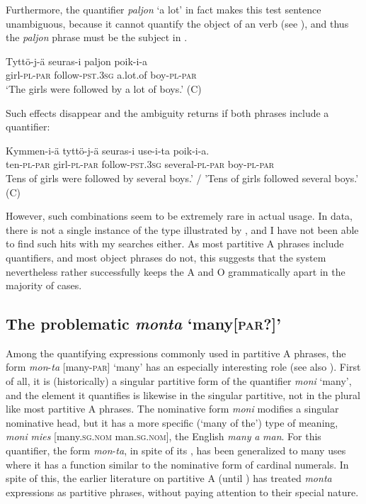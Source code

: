 \documentclass[output=paper]{LSP/langsci}
\begin{document}
Furthermore, the quantifier \textit{paljon} ‘a lot’ in fact makes this test sentence unambiguous, because it cannot quantify the object of an  verb (see \citealt{Karttunen1975Syntax}), and thus the \textit{paljon} phrase must be the subject in .

\ea%
\label{15-hu-ex:47}

\gll Tyttö-j-ä seuras-i paljon poik-i-a\\
girl-\textsc{pl}-\textsc{par} follow-\textsc{pst}.\textsc{3sg} a.lot.of boy-\textsc{pl}-\textsc{par}\\
\glt ‘The girls were followed by a lot of boys.’  (C)
\z

Such effects disappear and the ambiguity returns if both phrases include a quantifier:

\ea%
\label{15-hu-ex:48}

\gll Kymmen-i-ä tyttö-j-ä seuras-i use-i-ta poik-i-a.\\
ten-\textsc{pl}-\textsc{par} girl-\textsc{pl}-\textsc{par} follow-\textsc{pst}.\textsc{3sg} several-\textsc{pl}-\textsc{par} boy-\textsc{pl}-\textsc{par}\\
\glt Tens of girls were followed by several boys.’ / ’Tens of girls followed several boys.’  (C)
\z

However, such combinations seem to be extremely rare in actual usage. In \citeauthor{Yli-Vakkuri1979Partitiivisubjektin} data, there is not a single instance of the type illustrated by , and I have not been able to find such hits with my searches either. As most partitive A phrases include quantifiers, and most object phrases do not, this suggests that the system nevertheless rather successfully keeps the A and O grammatically apart in the majority of cases. 

\subsection{The problematic \textit{monta} ‘many[\textsc{par}?]’}
\label{15-hu-sec:6-2}

Among the quantifying expressions commonly used in partitive A phrases, the form \textit{mon}-\textit{ta} [many-\textsc{par}] ‘many’ has an especially interesting role (see also \citealt{Huumo2017Moni}). First of all, it is (historically) a singular partitive form of the quantifier \textit{moni} ‘many’, and the element it quantifies is likewise in the singular partitive, not in the plural like most partitive A phrases. The nominative form \textit{moni} modifies a singular nominative head, but it has a more specific (‘many of the’) type of meaning, \eg \textit{moni} \textit{mies} [many.\textsc{sg}.\textsc{nom} man.\textsc{sg}.\textsc{nom}], \cf the English \textit{many} \textit{a} \textit{man}. For this quantifier, the form \textit{mon}-\textit{ta}, in spite of its , has been generalized to many uses where it has a function similar to the nominative form of cardinal numerals. In spite of this, the earlier literature on partitive A (until \citealt{Branch2001Montaa}) has treated \textit{monta} expressions as partitive phrases, without paying attention to their special nature. 
\end{document}
